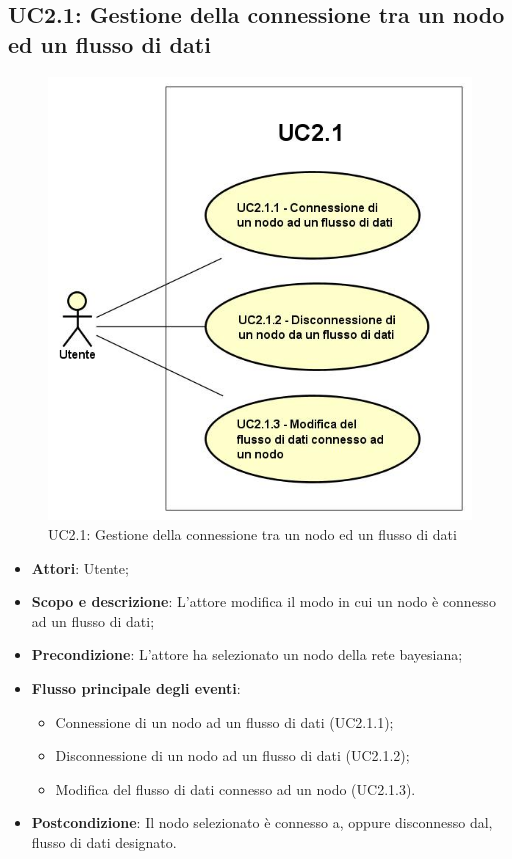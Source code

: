 \subsection{UC2.1: Gestione della connessione tra un nodo ed un flusso di dati}
\hypertarget{UC2.1}{}
\begin{figure} [H]
	\centering
	\includegraphics[scale=0.45]{Img/UC2-1}
	\caption{UC2.1: Gestione della connessione tra un nodo ed un flusso di dati}\label{}
\end{figure}
\begin{itemize}
	\item \textbf{Attori}: Utente;
	\item \textbf{Scopo e descrizione}: L'attore modifica il modo in cui un nodo è connesso ad un flusso di dati;
	\item \textbf{Precondizione}: L'attore ha selezionato un nodo della rete bayesiana;
	\item \textbf{Flusso principale degli eventi}:
	\begin{itemize}
		\item Connessione di un nodo ad un flusso di dati (UC2.1.1);
		\item Disconnessione di un nodo ad un flusso di dati (UC2.1.2);
		\item Modifica del flusso di dati connesso ad un nodo (UC2.1.3).
	\end{itemize}
	\item \textbf{Postcondizione}: Il nodo selezionato è connesso a, oppure disconnesso dal, flusso di dati designato.
\end{itemize}

